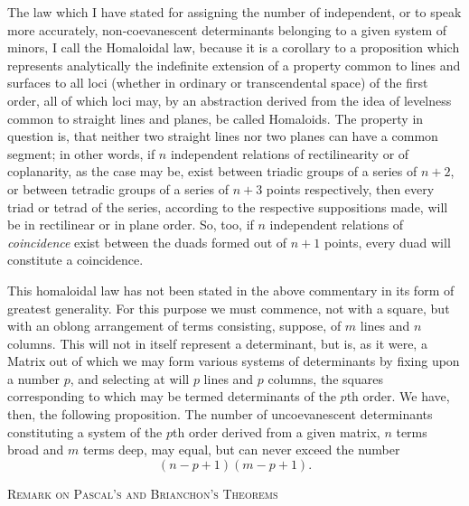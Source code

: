 \documentclass[11pt]{article}
\newcommand{\subpaperhead}[1]{\begin{center}{\large\scshape #1}\end{center}}
\begin{document}
The law which I have stated for assigning the number of independent, or to speak more accurately, non-coevanescent determinants belonging to a given system of minors, I call the Homaloidal law, because it is a corollary to a proposition which represents analytically the indefinite extension of a property common to lines and surfaces to all loci (whether in ordinary or transcendental space) of the first order, all of which loci may, by an abstraction derived from the idea of levelness common to straight lines and planes, be called Homaloids. The property in question is, that neither two straight lines nor two planes can have a common segment; in other words, if $n$ independent relations of rectilinearity or of coplanarity, as the case may be, exist between triadic groups of a series of $n+2$, or between tetradic groups of a series of $n+3$ points respectively, then every triad or tetrad of the series, according to the respective suppositions made, will be in rectilinear or in plane order. So, too, if $n$ independent relations of \emph{coincidence} exist between the duads formed out of $n+1$ points, every duad will constitute a coincidence.

This homaloidal law has not been stated in the above commentary in its form of greatest generality. For this purpose we must commence, not with a square, but with an oblong arrangement of terms consisting, suppose, of $m$ lines and $n$ columns. This will not in itself represent a determinant, but is, as it were, a Matrix out of which we may form various systems of determinants by fixing upon a number $p$, and selecting at will $p$ lines and $p$ columns, the squares corresponding to which may be termed determinants of the $p$th order. We have, then, the following proposition. The number of uncoevanescent determinants constituting a system of the $p$th order derived from a given matrix, $n$ terms broad and $m$ terms deep, may equal, but can never exceed the number
\[
(n-p+1)(m-p+1).
\]

\subpaperhead{Remark on Pascal's and Brianchon's Theorems}
\end{document}
